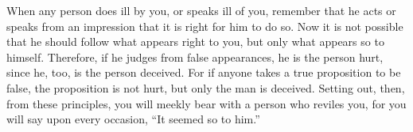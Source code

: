 When any person does ill by you, or speaks ill of you, remember that he acts or
speaks from  an impression that  it is right  for him to do  so. Now it  is not
possible that he should follow what appears right to you, but only what appears
so to himself. Therefore, if he judges from false appearances, he is the person
hurt,  since he,  too, is  the  person deceived.  For  if anyone  takes a  true
proposition to  be false,  the proposition  is not  hurt, but  only the  man is
deceived. Setting out, then, from these principles, you will meekly bear with a
person who reviles you, for you will say upon every occasion, ``It seemed so to
him.''
